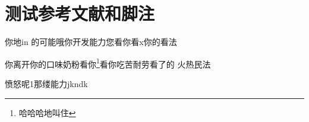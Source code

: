 \chapter{测试参考文献和脚注}
    你地in 的可能哦你开发能力您\cite{Bernard}看你看x你的看法

    你离开你的口味奶粉看你\footnote{哈哈哈地叫住}看你吃苦耐劳看了的\cite{indjkf}
    火热民法\cite{Bernard03}

    愤怒呢1那缕能力jkndk
\label{chap:mkm}
